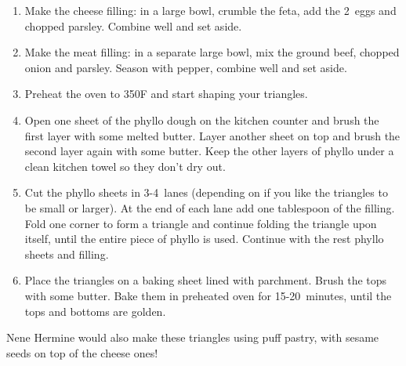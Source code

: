 \begin{enumerate}
    \item Make the cheese filling: in a large bowl, crumble the feta, add the 2~eggs and chopped parsley. Combine well and set aside.
    \item Make the meat filling: in a separate large bowl, mix the ground beef, chopped onion and parsley. Season with pepper, combine well and set aside.
    \item Preheat the oven to 350\degree F and start shaping your triangles.
    \item Open one sheet of the phyllo dough on the kitchen counter and brush the first layer with some melted butter. Layer another sheet on top and brush the second layer again with some butter. Keep the other layers of phyllo under a clean kitchen towel so they don't dry out.
    \item Cut the phyllo sheets in 3-4~lanes (depending on if you like the triangles to be small or larger). At the end of each lane add one tablespoon of the filling. Fold one corner to form a triangle and continue folding the triangle upon itself, until the entire piece of phyllo is used. Continue with the rest phyllo sheets and filling.
    \item Place the triangles on a baking sheet lined with parchment. Brush the tops with some butter. Bake them in preheated oven for 15-20~minutes, until the tops and bottoms are golden.
\end{enumerate}

Nene Hermine would also make these triangles using puff pastry, with sesame seeds on top of the cheese ones!
